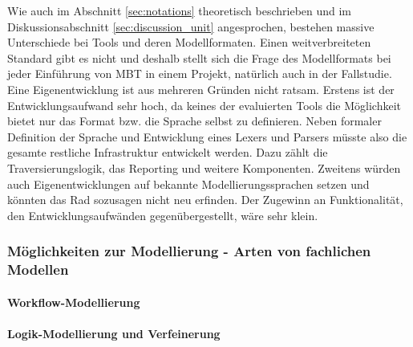 Wie auch im Abschnitt \ref{sec:notations} theoretisch beschrieben und im Diskussionsabschnitt \ref{sec:discussion_unit} angesprochen, bestehen massive Unterschiede bei Tools und deren Modellformaten. Einen weitverbreiteten Standard gibt es nicht und deshalb stellt sich die Frage des Modellformats bei jeder Einführung von MBT in einem Projekt, natürlich auch in der Fallstudie. Eine Eigenentwicklung ist aus mehreren Gründen nicht ratsam. Erstens ist der Entwicklungsaufwand sehr hoch, da keines der evaluierten Tools die Möglichkeit bietet nur das Format bzw. die Sprache selbst zu definieren. Neben formaler Definition der Sprache und Entwicklung eines Lexers und Parsers müsste also die gesamte restliche Infrastruktur entwickelt werden. Dazu zählt die Traversierungslogik, das Reporting und weitere Komponenten. Zweitens würden auch Eigenentwicklungen auf bekannte Modellierungssprachen setzen und könnten das Rad sozusagen nicht neu erfinden. Der Zugewinn an Funktionalität, den Entwicklungsaufwänden gegenübergestellt, wäre sehr klein.\\


\subsubsection{Möglichkeiten zur Modellierung - Arten von fachlichen Modellen}
\paragraph{Workflow-Modellierung}
\paragraph{Logik-Modellierung und Verfeinerung}























